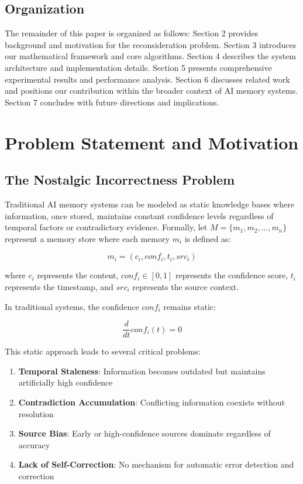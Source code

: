 \documentclass[12pt,a4paper]{article}
\begin{document}
\subsection{Organization}

The remainder of this paper is organized as follows: Section 2 provides background and motivation for the reconsideration problem. Section 3 introduces our mathematical framework and core algorithms. Section 4 describes the system architecture and implementation details. Section 5 presents comprehensive experimental results and performance analysis. Section 6 discusses related work and positions our contribution within the broader context of AI memory systems. Section 7 concludes with future directions and implications.

\section{Problem Statement and Motivation}

\subsection{The Nostalgic Incorrectness Problem}

Traditional AI memory systems can be modeled as static knowledge bases where information, once stored, maintains constant confidence levels regardless of temporal factors or contradictory evidence. Formally, let $M = \{m_1, m_2, \ldots, m_n\}$ represent a memory store where each memory $m_i$ is defined as:

\begin{equation}
m_i = (c_i, conf_i, t_i, src_i)
\end{equation}

where $c_i$ represents the content, $conf_i \in [0,1]$ represents the confidence score, $t_i$ represents the timestamp, and $src_i$ represents the source context.

In traditional systems, the confidence $conf_i$ remains static:

\begin{equation}
\frac{d}{dt}conf_i(t) = 0
\end{equation}

This static approach leads to several critical problems:

\begin{enumerate}
\item \textbf{Temporal Staleness}: Information becomes outdated but maintains artificially high confidence
\item \textbf{Contradiction Accumulation}: Conflicting information coexists without resolution
\item \textbf{Source Bias}: Early or high-confidence sources dominate regardless of accuracy
\item \textbf{Lack of Self-Correction}: No mechanism for automatic error detection and correction
\end{enumerate}
\end{document}
